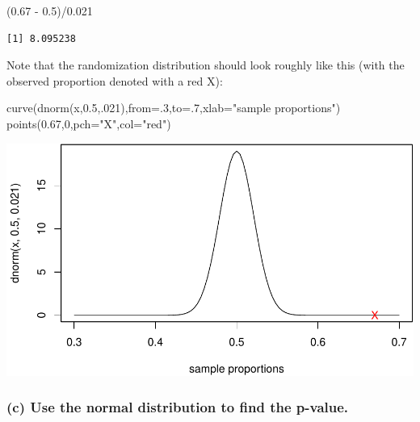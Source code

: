 \documentclass[
]{book}
\newenvironment{Shaded}{\begin{snugshade}}{\end{snugshade}}
\newcommand{\AttributeTok}[1]{\textcolor[rgb]{0.77,0.63,0.00}{#1}}
\newcommand{\DecValTok}[1]{\textcolor[rgb]{0.00,0.00,0.81}{#1}}
\newcommand{\FloatTok}[1]{\textcolor[rgb]{0.00,0.00,0.81}{#1}}
\newcommand{\FunctionTok}[1]{\textcolor[rgb]{0.00,0.00,0.00}{#1}}
\newcommand{\NormalTok}[1]{#1}
\newcommand{\SpecialCharTok}[1]{\textcolor[rgb]{0.00,0.00,0.00}{#1}}
\newcommand{\StringTok}[1]{\textcolor[rgb]{0.31,0.60,0.02}{#1}}
\begin{document}
\begin{Shaded}
\begin{Highlighting}[]
\NormalTok{(}\FloatTok{0.67} \SpecialCharTok{{-}} \FloatTok{0.5}\NormalTok{)}\SpecialCharTok{/}\FloatTok{0.021}
\end{Highlighting}
\end{Shaded}

\begin{verbatim}
[1] 8.095238
\end{verbatim}

Note that the randomization distribution should look roughly like this (with the observed proportion denoted with a red X):

\begin{Shaded}
\begin{Highlighting}[]
\FunctionTok{curve}\NormalTok{(}\FunctionTok{dnorm}\NormalTok{(x,}\FloatTok{0.5}\NormalTok{,.}\DecValTok{021}\NormalTok{),}\AttributeTok{from=}\NormalTok{.}\DecValTok{3}\NormalTok{,}\AttributeTok{to=}\NormalTok{.}\DecValTok{7}\NormalTok{,}\AttributeTok{xlab=}\StringTok{"sample proportions"}\NormalTok{)}
\FunctionTok{points}\NormalTok{(}\FloatTok{0.67}\NormalTok{,}\DecValTok{0}\NormalTok{,}\AttributeTok{pch=}\StringTok{"X"}\NormalTok{,}\AttributeTok{col=}\StringTok{"red"}\NormalTok{)}
\end{Highlighting}
\end{Shaded}

\includegraphics[width=1\linewidth]{Class_Activity_16_files/figure-latex/unnamed-chunk-2-1}

\hypertarget{c-use-the-normal-distribution-to-find-the-p-value.}{%
\subsubsection{(c) Use the normal distribution to find the p-value.}\label{c-use-the-normal-distribution-to-find-the-p-value.}}
\end{document}
